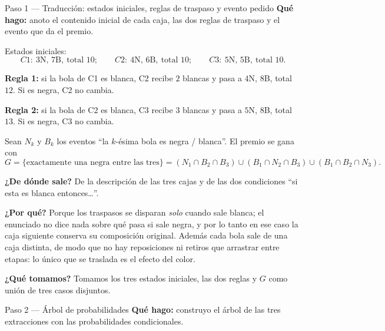 \documentclass[11pt]{article}
\begin{document}
\begin{sol}

\begin{paso}{Paso 1 --- Traducci\'on: estados iniciales, reglas de traspaso y evento pedido}
\textbf{Qu\'e hago:} anoto el contenido inicial de cada caja, las dos reglas de traspaso y el evento que da el premio.

Estados iniciales:
\[
C1:\ 3\text{N},\,7\text{B},\ \text{total } 10;
\qquad
C2:\ 4\text{N},\,6\text{B},\ \text{total } 10;
\qquad
C3:\ 5\text{N},\,5\text{B},\ \text{total } 10 .
\]

\textbf{Regla 1:} si la bola de C1 es blanca, C2 recibe $2$ blancas y pasa a $4$N, $8$B, total $12$. Si es negra, C2 no cambia.

\textbf{Regla 2:} si la bola de C2 es blanca, C3 recibe $3$ blancas y pasa a $5$N, $8$B, total $13$. Si es negra, C3 no cambia.

Sean $N_k$ y $B_k$ los eventos ``la $k$-\'esima bola es negra / blanca''. El premio se gana con
\[
G=\{\text{exactamente una negra entre las tres}\}
=(N_1\cap B_2\cap B_3)\cup(B_1\cap N_2\cap B_3)\cup(B_1\cap B_2\cap N_3).
\]

\textbf{¿De d\'onde sale?} De la descripci\'on de las tres cajas y de las dos condiciones ``si esta es blanca entonces\dots''.

\textbf{¿Por qu\'e?} Porque los traspasos se disparan \emph{solo} cuando sale blanca; el enunciado no dice nada sobre qu\'e pasa si sale negra, y por lo tanto en ese caso la caja siguiente conserva su composici\'on original. Adem\'as cada bola sale de una caja distinta, de modo que no hay reposiciones ni retiros que arrastrar entre etapas: lo \'unico que se traslada es el efecto del color.

\textbf{¿Qu\'e tomamos?} Tomamos los tres estados iniciales, las dos reglas y $G$ como uni\'on de tres casos disjuntos.
\end{paso}

\begin{paso}{Paso 2 --- \'Arbol de probabilidades}
\textbf{Qu\'e hago:} construyo el \'arbol de las tres extracciones con las probabilidades condicionales.


\end{paso}
\end{sol}
\end{document}
